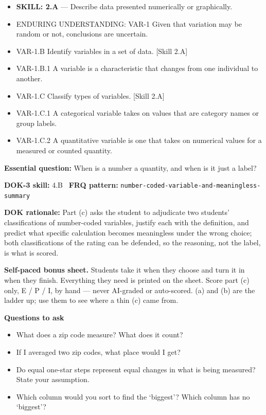 \documentclass[11pt]{article}
\begin{document}


{\small
\begin{itemize}[leftmargin=1.5em,itemsep=2pt,topsep=2pt]
  \item \textbf{SKILL: 2.A} --- Describe data presented numerically or graphically.
  \item ENDURING UNDERSTANDING: VAR-1 Given that variation may be random or not, conclusions are uncertain.
  \item VAR-1.B Identify variables in a set of data. [Skill 2.A]
  \item VAR-1.B.1 A variable is a characteristic that changes from one individual to another.
  \item VAR-1.C Classify types of variables. [Skill 2.A]
  \item VAR-1.C.1 A categorical variable takes on values that are category names or group labels.
  \item VAR-1.C.2 A quantitative variable is one that takes on numerical values for a measured or counted quantity.
\end{itemize}
}
\textbf{Essential question:} When is a number a quantity, and when is it just a label?\par
\textbf{DOK-3 skill:} 4.B \textperiodcentered\ \textbf{FRQ pattern:} {\small\texttt{number-\allowbreak{}coded-\allowbreak{}variable-\allowbreak{}and-\allowbreak{}meaningless-\allowbreak{}summary}}\par
\textbf{DOK rationale:} Part (c) asks the student to adjudicate two students' classifications of number-coded variables, justify each with the definition, and predict what specific calculation becomes meaningless under the wrong choice; both classifications of the rating can be defended, so the reasoning, not the label, is what is scored.\par

\textbf{Self-paced bonus sheet.} Students take it when they choose and turn it in when they finish. Everything they need is printed on the sheet. Score part (c) only, E / P / I, by hand --- never AI-graded or auto-scored. (a) and (b) are the ladder up; use them to see where a thin (c) came from.\par

\textbf{Questions to ask}
\begin{itemize}[leftmargin=1.5em,itemsep=2pt,topsep=2pt]
  \item What does a zip code measure? What does it count?
  \item If I averaged two zip codes, what place would I get?
  \item Do equal one-star steps represent equal changes in what is being measured? State your assumption.
  \item Which column would you sort to find the `biggest'? Which column has no `biggest'?
\end{itemize}
\end{document}
